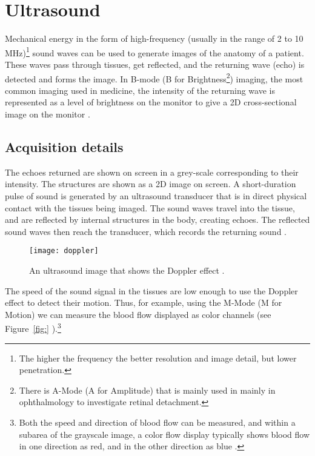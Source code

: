 \chapter{Ultrasound}

Mechanical energy in the form of high-frequency (usually in the range
of 2 to 10 MHz)\footnote{The higher the frequency the better
  resolution and image detail, but lower penetration.} sound waves can
be used to generate images of the anatomy of a patient. These waves
pass through tissues, get reflected, and the returning wave (echo) is
detected and forms the image. In B-mode (B for
Brightness\footnote{There is A-Mode (A for Amplitude) that is mainly
  used in mainly in ophthalmology to investigate retinal detachment.})
imaging, the most common imaging used in medicine, the intensity of
the returning wave is represented as a level of brightness on the
monitor to give a 2D cross-sectional image on the monitor
\cite{abdulla2025ultrasound}.

\section{Acquisition details}
The echoes returned are shown on screen in a grey-scale corresponding
to their intensity. The structures are shown as a 2D image on
screen. A short-duration pulse of sound is generated by an ultrasound
transducer that is in direct physical contact with the tissues being
imaged. The sound waves travel into the tissue, and are reflected by
internal structures in the body, creating echoes. The reflected sound
waves then reach the transducer, which records the returning sound
\cite{bushberg2011essential,abdulla2025ultrasound_machine}.

\begin{figure}
  \centering
  \texttt{[image: doppler]}
  \caption{An ultrasound image that shows the Doppler effect
    \cite{abdulla2025ultrasound_imaging_doppler}.\label{fig:doppler}}
\end{figure}

The speed of the sound signal in the tissues are low enough to use the
Doppler effect to detect their motion. Thus, for example, using the
M-Mode (M for Motion) we can measure the blood flow displayed as color
channels (see Figure~\ref{fig:}
).\footnote{Both the speed
  and direction of blood flow can be measured, and within a subarea of
  the grayscale image, a color flow display typically shows blood flow
  in one direction as red, and in the other direction as blue
  \cite{bushberg2011essential}.}

